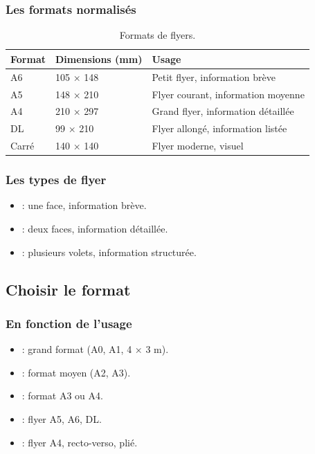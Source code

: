 \subsubsection{Les formats normalisés}

\begin{table}[h!]
\centering
\begin{tabular}{@{}lll@{}}
\toprule
\textbf{Format} & \textbf{Dimensions (mm)} & \textbf{Usage} \\
\midrule
A6 & 105 × 148 & Petit flyer, information brève \\
A5 & 148 × 210 & Flyer courant, information moyenne \\
A4 & 210 × 297 & Grand flyer, information détaillée \\
DL & 99 × 210 & Flyer allongé, information listée \\
Carré & 140 × 140 & Flyer moderne, visuel \\
\bottomrule
\end{tabular}
\caption{Formats de flyers.}
\end{table}

\subsubsection{Les types de flyer}

\begin{itemize}
    \item {} : une face, information brève.
    \item {} : deux faces, information détaillée.
    \item {} : plusieurs volets, information structurée.
\end{itemize}

\subsection{Choisir le format}

\subsubsection{En fonction de l'usage}

\begin{itemize}
    \item {} : grand format (A0, A1, 4 × 3 m).
    \item {} : format moyen (A2, A3).
    \item {} : format A3 ou A4.
    \item {} : flyer A5, A6, DL.
    \item {} : flyer A4, recto-verso, plié.
\end{itemize}


